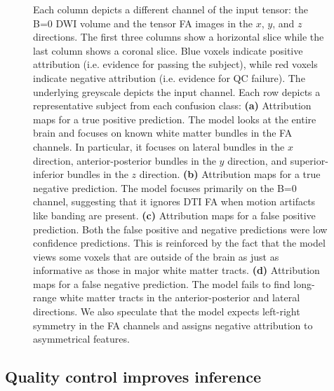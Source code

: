\documentclass[fleqn,10pt]{wlscirep}
\begin{document}
\begin{figure}[tbp]
{        Each column depicts a different channel of the input tensor: the B=0 DWI volume and
        the tensor FA images in the $x$, $y$, and $z$ directions. The first three columns
        show a horizontal slice while the last column shows a coronal slice. Blue voxels
        indicate positive attribution (i.e. evidence for passing the subject),
        while red voxels indicate negative attribution (i.e. evidence for QC
        failure). The underlying greyscale depicts the input channel. Each row
        depicts a representative subject from each confusion class:
        \textbf{(a)} Attribution maps for a true positive prediction.  The model
        looks at the entire brain and focuses on known white matter bundles in
        the FA channels. In particular, it focuses on lateral bundles in the
        $x$ direction, anterior-posterior bundles in the $y$ direction, and
        superior-inferior bundles in the $z$ direction.
        \textbf{(b)} Attribution maps for a true negative prediction. The model
        focuses primarily on the B=0 channel, suggesting that it ignores DTI FA
        when motion artifacts like banding are present.
        \textbf{(c)} Attribution maps for a false positive prediction. Both the
        false positive and negative predictions were low confidence predictions.
        This is reinforced by the fact that the model views some voxels that are
        outside of the brain as just as informative as those in major white
        matter tracts.
        \textbf{(d)} Attribution maps for a false negative prediction. The model
        fails to find long-range white matter tracts in the anterior-posterior
        and lateral directions. We also speculate that the model expects
        left-right symmetry in the FA channels and assigns negative attribution
        to asymmetrical features.
    }
    \label{fig:ig}
\end{figure}

\subsection*{Quality control improves inference}
\end{document}
